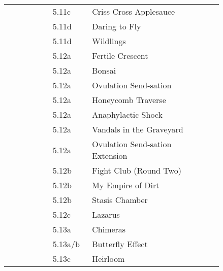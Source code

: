 \begin{flushleft}
\begin{center}
\begin{supertabular}{p{0.18\linewidth}p{0.13\linewidth}p{0.45\linewidth}p{0.08\linewidth}}
&5.11c&Criss Cross Applesauce & \pageref{rt:Criss Cross Applesauce} \\
&5.11d&Daring to Fly & \pageref{rt:Daring to Fly} \\
&5.11d&Wildlings & \pageref{rt:Wildlings} \\
&5.12a&Fertile Crescent & \pageref{rt:Fertile Crescent} \\
&5.12a&Bonsai & \pageref{rt:Bonsai} \\
&5.12a&Ovulation Send-sation & \pageref{rt:Ovulation Send-sation} \\
&5.12a&Honeycomb Traverse & \pageref{vr:Honeycomb Traverse} \\
&5.12a&Anaphylactic Shock & \pageref{rt:Anaphylactic Shock} \\
&5.12a&Vandals in the Graveyard & \pageref{rt:Vandals in the Graveyard} \\
&5.12a&Ovulation Send-sation Extension & \pageref{vr:Ovulation Send-sation Extension} \\
&5.12b&Fight Club (Round Two) & \pageref{rt:Fight Club (Round Two)} \\
&5.12b&My Empire of Dirt & \pageref{rt:My Empire of Dirt} \\
&5.12b&Stasis Chamber & \pageref{rt:Stasis Chamber} \\
&5.12c&Lazarus & \pageref{vr:Lazarus} \\
&5.13a&Chimeras & \pageref{rt:Chimeras} \\
&5.13a/b&Butterfly Effect & \pageref{rt:Butterfly Effect} \\
&5.13c&Heirloom & \pageref{rt:Heirloom} \\
\end{supertabular}
\end{center}

\end{flushleft}
